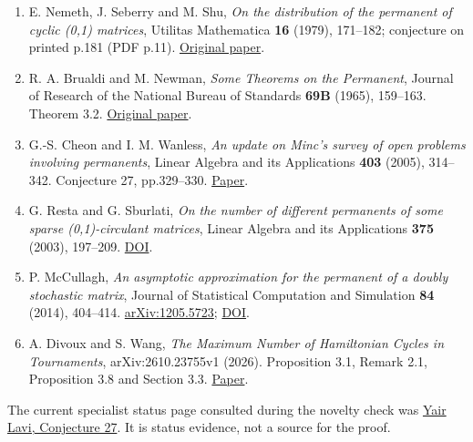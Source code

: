 \documentclass[
  11pt,
]{article}
\providecommand{\tightlist}{%
  \setlength{\itemsep}{0pt}\setlength{\parskip}{0pt}}
\begin{document}
\begin{enumerate}
\def\labelenumi{\arabic{enumi}.}
\tightlist
\item
  E. Nemeth, J. Seberry and M. Shu, \emph{On the distribution of the
  permanent of cyclic (0,1) matrices}, Utilitas Mathematica \textbf{16}
  (1979), 171--182; conjecture on printed p.181 (PDF p.11).
  \href{https://documents.uow.edu.au/~jennie/WEBPDF/071_1979.pdf}{Original
  paper}.
\item
  R. A. Brualdi and M. Newman, \emph{Some Theorems on the Permanent},
  Journal of Research of the National Bureau of Standards \textbf{69B}
  (1965), 159--163. Theorem 3.2.
  \href{https://nvlpubs.nist.gov/nistpubs/jres/69B/jresv69Bn3p159_A1b.pdf}{Original
  paper}.
\item
  G.-S. Cheon and I. M. Wanless, \emph{An update on Minc's survey of
  open problems involving permanents}, Linear Algebra and its
  Applications \textbf{403} (2005), 314--342. Conjecture 27,
  pp.329--330.
  \href{https://users.monash.edu.au/~iwanless/papers/permsurveyLAA.pdf}{Paper}.
\item
  G. Resta and G. Sburlati, \emph{On the number of different permanents
  of some sparse (0,1)-circulant matrices}, Linear Algebra and its
  Applications \textbf{375} (2003), 197--209.
  \href{https://doi.org/10.1016/S0024-3795(03)00649-9}{DOI}.
\item
  P. McCullagh, \emph{An asymptotic approximation for the permanent of a
  doubly stochastic matrix}, Journal of Statistical Computation and
  Simulation \textbf{84} (2014), 404--414.
  \href{https://arxiv.org/abs/1205.5723}{arXiv:1205.5723};
  \href{https://doi.org/10.1080/00949655.2012.712122}{DOI}.
\item
  A. Divoux and S. Wang, \emph{The Maximum Number of Hamiltonian Cycles
  in Tournaments}, arXiv:2610.23755v1 (2026). Proposition 3.1, Remark
  2.1, Proposition 3.8 and Section 3.3.
  \href{https://arxiv.org/html/2610.23755v1}{Paper}.
\end{enumerate}

The current specialist status page consulted during the novelty check
was
\href{https://yair-lavi.com/mincs-list/conjecture-27/index.html}{Yair
Lavi, Conjecture 27}. It is status evidence, not a source for the proof.
\end{document}
